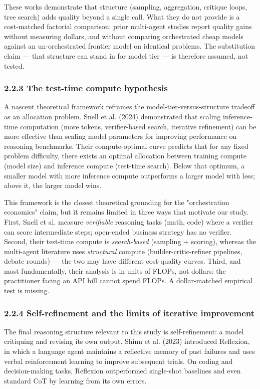 \documentclass[11pt,a4paper]{article}
\begin{document}
These works demonstrate that structure (sampling, aggregation, critique
loops, tree search) adds quality beyond a single call. What they do not
provide is a cost-matched factorial comparison: prior multi-agent studies
report quality gains without measuring dollars, and without comparing
orchestrated cheap models against an un-orchestrated frontier model on
identical problems. The substitution claim — that structure can stand in
for model tier — is therefore assumed, not tested.

\subsubsection{2.2.3 The test-time compute hypothesis}

A nascent theoretical framework reframes the model-tier-versus-structure
tradeoff as an allocation problem. Snell et al. (2024) demonstrated that
scaling inference-time computation (more tokens, verifier-based search,
iterative refinement) can be more effective than scaling model parameters
for improving performance on reasoning benchmarks. Their compute-optimal
curve predicts that for any fixed problem difficulty, there exists an
optimal allocation between training compute (model size) and inference
compute (test-time search). Below that optimum, a smaller model with more
inference compute outperforms a larger model with less; above it, the
larger model wins.

This framework is the closest theoretical grounding for the "orchestration
economics" claim, but it remains limited in three ways that motivate our
study. First, Snell et al. measure \textit{verifiable} reasoning tasks (math,
code) where a verifier can score intermediate steps; open-ended business
strategy has no verifier. Second, their test-time compute is
\textit{search-based} (sampling + scoring), whereas the multi-agent literature
uses \textit{structural} compute (builder-critic-refiner pipelines, debate rounds)
— the two may have different cost-quality curves. Third, and most
fundamentally, their analysis is in units of FLOPs, not dollars: the
practitioner facing an API bill cannot spend FLOPs. A dollar-matched
empirical test is missing.

\subsubsection{2.2.4 Self-refinement and the limits of iterative improvement}

The final reasoning structure relevant to this study is self-refinement:
a model critiquing and revising its own output. Shinn et al. (2023)
introduced Reflexion, in which a language agent maintains a reflective
memory of past failures and uses verbal reinforcement learning to improve
subsequent trials. On coding and decision-making tasks, Reflexion
outperformed single-shot baselines and even standard CoT by learning from
its own errors.
\end{document}
